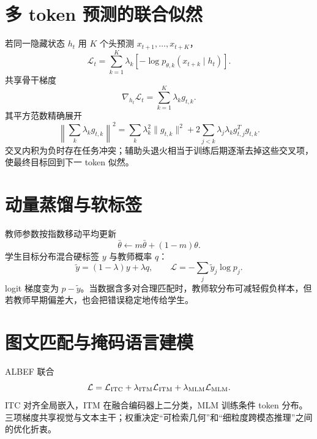 \documentclass[11pt]{article}
\numberwithin{equation}{section}
\newcommand{\1}{\mathbf{1}}
\newcommand{\cL}{\mathcal{L}}
\begin{document}
\section{多 token 预测的联合似然}

若同一隐藏状态 $h_t$ 用 $K$ 个头预测 $x_{t+1},\ldots,x_{t+K}$，
\begin{equation}
 \cL_t=\sum_{k=1}^{K}\lambda_k
 [-\log p_{\theta,k}(x_{t+k}\mid h_t)].
\end{equation}
共享骨干梯度
\begin{equation}
 \nabla_{h_t}\cL_t=\sum_{k=1}^{K}\lambda_k g_{t,k}.
\end{equation}
其平方范数精确展开
\begin{equation}
 \left\|\sum_k\lambda_kg_{t,k}\right\|^2
 =\sum_k\lambda_k^2\|g_{t,k}\|^2
 +2\sum_{j<k}\lambda_j\lambda_k g_{t,j}^Tg_{t,k}.
\end{equation}
交叉内积为负时存在任务冲突；辅助头退火相当于训练后期逐渐去掉这些交叉项，
使最终目标回到下一 token 似然。

\section{动量蒸馏与软标签}
教师参数按指数移动平均更新
\begin{equation}
  \bar\theta\leftarrow m\bar\theta+(1-m)\theta.
\end{equation}
学生目标分布混合硬标签 $y$ 与教师概率 $q$：
\begin{equation}
  \tilde y=(1-\lambda)y+\lambda q,
  \qquad
  \cL=-\sum_j\tilde y_j\log p_j.
\end{equation}
logit 梯度变为 $p-\tilde y$。当数据含多对合理匹配时，教师软分布可减轻假负样本，但若教师早期偏差大，也会把错误稳定地传给学生。

\section{图文匹配与掩码语言建模}
ALBEF 联合
\begin{equation}
  \cL=\cL_{\rm ITC}+\lambda_{\rm ITM}\cL_{\rm ITM}
  +\lambda_{\rm MLM}\cL_{\rm MLM}.
\end{equation}
ITC 对齐全局嵌入，ITM 在融合编码器上二分类，MLM 训练条件 token 分布。三项梯度共享视觉与文本主干；权重决定“可检索几何”和“细粒度跨模态推理”之间的优化折衷。
\end{document}
